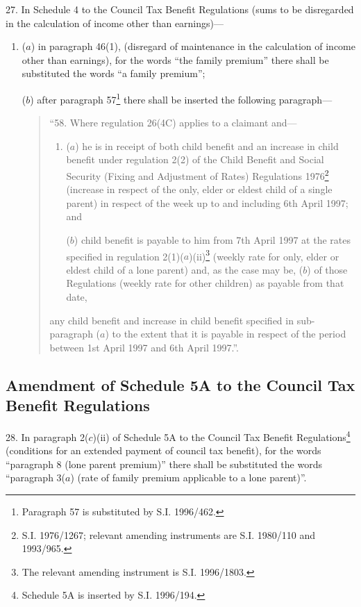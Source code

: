 \documentclass[12pt,a4paper]{article}
\begin{document}
27.  In Schedule 4 to the Council Tax Benefit Regulations (sums to be disregarded in the calculation of income other than earnings)—
\begin{enumerate}\item[]
($a$) in paragraph 46(1), (disregard of maintenance in the calculation of income other than earnings), for the words “the family premium” there shall be substituted the words “a family premium”;

($b$) after paragraph 57\footnote{\frenchspacing Paragraph 57 is substituted by S.I. 1996/462.} there shall be inserted the following paragraph—
\begin{quotation}
“58.  Where regulation 26(4C) applies to a claimant and—
\begin{enumerate}\item[]
($a$) he is in receipt of both child benefit and an increase in child benefit under regulation 2(2) of the Child Benefit and Social Security (Fixing and Adjustment of Rates) Regulations 1976\footnote{\frenchspacing S.I. 1976/1267; relevant amending instruments are S.I. 1980/110 and 1993/965.} (increase in respect of the only, elder or eldest child of a single parent) in respect of the week up to and including 6th April 1997; and

($b$) child benefit is payable to him from 7th April 1997 at the rates specified in regulation 2(1)($a$)(ii)\footnote{\frenchspacing The relevant amending instrument is S.I. 1996/1803.} (weekly rate for only, elder or eldest child of a lone parent) and, as the case may be, ($b$) of those Regulations (weekly rate for other children) as payable from that date,
\end{enumerate}
any child benefit and increase in child benefit specified in sub-paragraph ($a$) to the extent that it is payable in respect of the period between 1st April 1997 and 6th April 1997.”.
\end{quotation}
\end{enumerate}

\subsection[28. Amendment of Schedule 5A to the Council Tax Benefit Regulations]{Amendment of Schedule 5A to the Council Tax Benefit Regulations}

28.  In paragraph 2($c$)(ii) of Schedule 5A to the Council Tax Benefit Regulations\footnote{\frenchspacing Schedule 5A is inserted by S.I. 1996/194.} (conditions for an extended payment of council tax benefit), for the words “paragraph 8 (lone parent premium)” there shall be substituted the words “paragraph 3($a$) (rate of family premium applicable to a lone parent)”.
\end{document}
